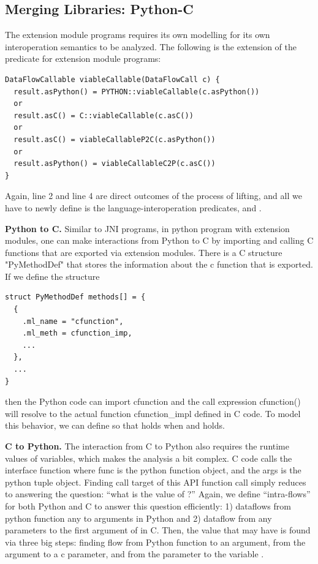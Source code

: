 \subsection{Merging Libraries: Python-C}\label{sec:merging2}
The extension module programs requires its own modelling for its own interoperation
semantics to be analyzed.
The following is the extension of the predicate 
for extension module programs:
\begin{lstlisting}[style=codeql,xleftmargin=2.5em]
DataFlowCallable viableCallable(DataFlowCall c) {
  result.asPython() = PYTHON::viableCallable(c.asPython())
  or
  result.asC() = C::viableCallable(c.asC())
  or
  result.asC() = viableCallableP2C(c.asPython())
  or
  result.asPython() = viableCallableC2P(c.asC())
}
\end{lstlisting}
Again, line 2 and line 4 are direct outcomes of the process of lifting,
and all we have to newly define is the language-interoperation predicates,
 and . 

\textbf{Python to C.} Similar to JNI programs, in python program with 
extension modules, one can make interactions from
Python to C by importing and calling C functions that are exported via
extension modules. There is a C structure "PyMethodDef"
that stores the information about the c function that is exported. If we define
the structure

\begin{lstlisting}[style=cpp,xleftmargin=2.5em]
struct PyMethodDef methods[] = {
  {
    .ml_name = "cfunction",
    .ml_meth = cfunction_imp,
    ...
  },
  ...
}
\end{lstlisting}

then the Python code can import cfunction and the call expression cfunction()
will resolve to the actual function cfunction\_impl defined in C code. To model
this behavior, we can define  so that  holds when  and
 holds.

\medskip
\textbf{C to Python.} The interaction from C to Python also requires
the runtime values of variables, which makes the analysis a bit complex. 
C code calls the interface function 
where func is the python function object, and the args is the python tuple
object. Finding call target of this API function call simply reduces to answering the
question: ``what is the value of ?'' Again, we define
``intra-flows'' for both Python and C to answer this question efficiently: 1) dataflows from 
python function any to arguments in Python and 2) dataflow from any parameters to the first argument of
 in C. Then, the value that  may have
is found via three big steps: finding flow from Python function to an argument, from the argument to
a c parameter, and from the parameter to the variable .

